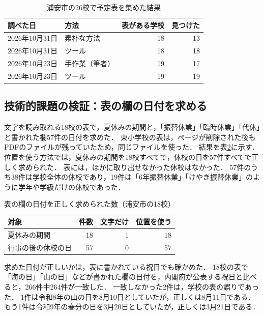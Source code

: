 \documentclass[a4paper,12pt,oneside]{jex}
\begin{document}
\begin{table}[htbp]
\centering
\caption{浦安市の26校で予定表を集めた結果}
\label{tab:verify}
\begin{tabular}{llrr}
\toprule
調べた日 & 方法 & 表がある学校 & 見つけた \\
\midrule
2026年10月31日 & 素朴な方法 & 18 & 13 \\
2026年10月31日 & ツール & 18 & 18 \\
2026年10月23日 & 手作業（筆者） & 19 & 17 \\
2026年10月23日 & ツール & 19 & 19 \\
\bottomrule
\end{tabular}
\end{table}

\subsection{技術的課題の検証：表の欄の日付を求める}
\label{subsec:v_date}

文字を読み取れる18校の表で，夏休みの期間と，「振替休業」「臨時休業」「代休」と書かれた欄57件の日付を求めた．
東小学校の表は，ページが削除された後もPDFのファイルが残っていたため，同じファイルを使った．
結果を表\ref{tab:date}に示す．
位置を使う方法では，夏休みの期間を18校すべてで，休校の日を57件すべてで正しく求められた．
表には，ほかに取り出せなかった休校はなかった．
57件のうち38件は学校全体の休校であり，19件は「6年振替休業」「けやき振替休業」のように学年や学級だけの休校であった．

\begin{table}[htbp]
\centering
\caption{表の欄の日付を正しく求められた数（浦安市の18校）}
\label{tab:date}
\begin{tabular}{lrrr}
\toprule
対象 & 件数 & 文字だけ & 位置を使う \\
\midrule
夏休みの期間 & 18 & 1 & 18 \\
行事の後の休校の日 & 57 & 0 & 57 \\
\bottomrule
\end{tabular}
\end{table}

求めた日付が正しいかは，表に書かれている祝日でも確かめた．
18校の表で「海の日」「山の日」などが書かれた欄の日付を，内閣府が公表する祝日\cite{holiday}と比べると，266件中264件が一致した．
一致しなかった2件は，学校の表の誤りであった．
1件は令和8年の山の日を8月10日としていたが，正しくは8月11日である．
もう1件は令和9年の春分の日を3月20日としていたが，正しくは3月21日である．
\end{document}
